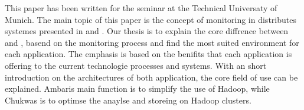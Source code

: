 
This paper has been written for the seminar \isdslong at the Technical Universaty of Munich. The main topic of this paper is the concept of monitoring in distributes systemes presented in \ambshort and \chukshort. Our thesis is to explain the core diffrence between \ambshort and \chukshort, basend on the monitoring process and find the most suited environment for each application. The emphasis is based on the benifits that each application is offering to the current technologie processes and systems. With an short introduction on the architectures of both application, the core field of use can be explained. Ambaris main function is to simplify the use of Hadoop, while Chukwas is to optimse the anaylse and storeing on Hadoop clusters. 